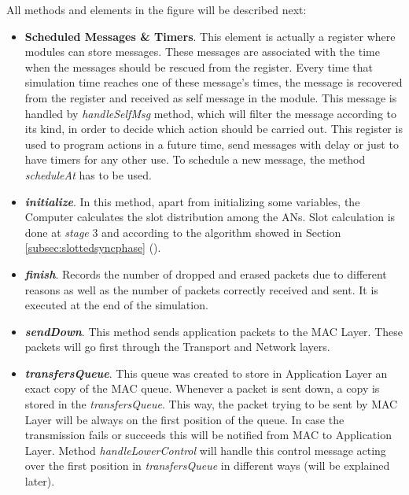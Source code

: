 All methods and elements in the figure will be described next:

\begin{itemize}
  \item \textbf{Scheduled Messages \& Timers}. This element is actually a register where modules can store messages. These messages are associated 
  with the time when the messages should be rescued from the register. Every time that simulation time reaches one of these message's times, the 
  message is recovered from the register and received as self message in the module. This message is handled by \textit{handleSelfMsg} method, 
  which will filter the message according to its kind, in order to decide which action should be carried out. This register is used to program actions in a 
  future time, send messages with delay or just to have timers for any other use. To schedule a new message, the method \textit{scheduleAt} has 
  to be used.
 
  \item \textbf{\textit{initialize}}. In this method, apart from initializing some variables, the Computer calculates the slot distribution among the 
  \acp{AN}. Slot calculation is done at \textit{stage} 3 and according to the algorithm showed in Section \ref{subsec:slottedsyncphase} 
  (). 

  \item \textbf{\textit{finish}}. Records the number of dropped and erased packets due to different reasons as well as the number of packets
  correctly received and sent. It is executed at the end of the simulation.

  \item \textbf{\textit{sendDown}}. This method sends application packets to the \ac{MAC} Layer. These packets will go first through the Transport 
  and Network layers.

  \item \textbf{\textit{transfersQueue}}. This queue was created to store in Application Layer an exact copy of the \ac{MAC} queue. Whenever a packet
  is sent down, a copy is stored in the \textit{transfersQueue}. This way, the packet trying to be sent by \ac{MAC} Layer will be always on the
  first position of the queue. In case the transmission fails or succeeds this will be notified from \ac{MAC} to Application Layer. Method
  \textit{handleLowerControl} will handle this control message acting over the first position in \textit{transfersQueue} in different ways (will 
  be explained later).


\end{itemize}
